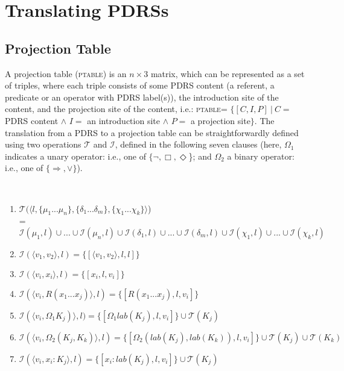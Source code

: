\section{Translating PDRSs}\label{sec:translating}

\subsection{Projection Table}

A projection table (\textsc{ptable}) is an $n\times3$ matrix, which can be
represented as a set of triples, where each triple consists of some PDRS
content (a referent, a predicate or an operator with PDRS label(s)), the
introduction site of the content, and the projection site of the content,
i.e.: \textsc{ptable}= $\{[C,I,P]~|~C=$ PDRS content $\wedge$ $I=$ an
introduction site $\wedge$ $P=$ a projection site$\}$. The translation from
a PDRS to a projection table can be straightforwardly defined using two
operations $\mathcal{T}$ and $\mathcal{I}$, defined in the following seven
clauses (here, $\Omega_1$ indicates a unary operator: i.e., one of $\{\neg, \Box,
\Diamond$\}; and $\Omega_2$ a binary operator: i.e., one of $\{\Rightarrow,
\vee\}$).

\begin{definition}~\\\vspace{-12pt}
\begin{enumerate}
  \item $\mathcal{T}(\langle l,\{\mu_1...\mu_n\},
    \{\delta_1...\delta_m\}, \{\chi_1...\chi_k\}\rangle$)\\
    = $\mathcal{I}(\mu_1,l)\cup...\cup \mathcal{I}(\mu_n, l)\cup
      \mathcal{I}(\delta_1,l)\cup...\cup \mathcal{I}(\delta_m,l)\cup
      \mathcal{I}(\chi_1,l)\cup...\cup \mathcal{I}(\chi_k,l)$
  \item $\mathcal{I}(\langle v_1, v_2 \rangle,l)
    = \{[\langle v_1, v_2 \rangle,l,l]\}$
  \item $\mathcal{I}(\langle v_i, x_i \rangle,l)
    = \{[x_i,l,v_i]\}$
  \item $\mathcal{I}(\langle v_i, R(x_1...x_j) \rangle,l)
    = \{[R(x_1...x_j),l,v_i]\}$
  \item $\mathcal{I}(\langle v_i, \Omega_1 K_j) \rangle,l)
    = \{[\Omega_1 lab(K_j),l,v_i]\} \cup \mathcal{T}(K_j)$
  \item $\mathcal{I}(\langle v_i,  \Omega_2(K_j, K_k) \rangle,l)
    = \{[\Omega_2(lab(K_j),lab(K_k)),l,v_i]\} \cup \mathcal{T}(K_j)
      \cup \mathcal{T}(K_k)$
  \item $\mathcal{I}(\langle v_i, x_i:K_j \rangle,l)
    = \{[x_i:lab(K_j),l,v_i]\} \cup \mathcal{T}(K_j)$
\end{enumerate}
\end{definition}

